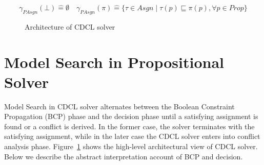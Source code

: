 \begin{equation*}
  \gamma_{PAsgn}(\bot) \mathrel{\hat=} \emptyset
  \quad 
  \gamma_{PAsgn}(\pi) \mathrel{\hat=} \{ \tau \in Asgn \mid \tau(p) \sqsubseteq
  \pi(p), \forall p \in Prop \} 
\end{equation*}
%
\begin{figure}[htbp]
\centering
\vspace*{-0.2cm}
\caption{Architecture of CDCL solver \label{fig:cdcl}}
\end{figure}
\section{Model Search in Propositional Solver}
Model Search in CDCL solver alternates between the Boolean Constraint
Propagation (BCP) phase and the decision phase until a satisfying assignment is
found or a conflict is derived.  In the former case, the solver terminates with
the satisfying assignment, while in the later case the CDCL solver enters into
conflict analysis phase.  Figure~\ref{fig:cdcl} shows the high-level
architectural view of CDCL solver.  Below we describe the abstract interpretation 
account of BCP and decision.
%
